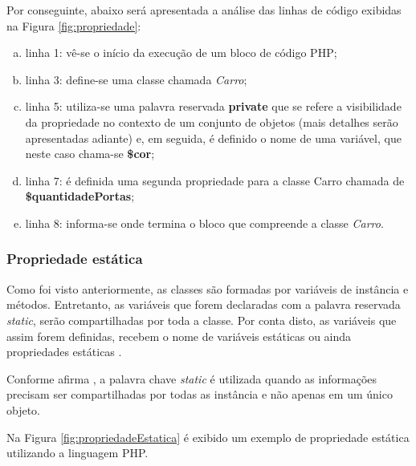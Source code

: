 \FloatBarrier 	%

Por conseguinte, abaixo será apresentada a análise das linhas de código
exibidas na Figura \ref{fig:propriedade}:

\begin{enumerate}[a)]
    \item linha 1: vê-se o início da execução de um bloco de código PHP;
    \item linha 3: define-se uma classe chamada \textit{Carro};
    \item linha 5: utiliza-se uma palavra reservada \textbf{private} que se
    refere a visibilidade da propriedade no contexto de um conjunto de objetos 
    (mais detalhes serão apresentadas adiante) e, em seguida, é definido o nome
    de uma variável, que neste caso chama-se \textbf{\$cor};
    \item linha 7: é definida uma segunda propriedade para a classe
    Carro chamada de \textbf{\$quantidadePortas};
    \item linha 8: informa-se onde termina o bloco que compreende a
    classe \textit{Carro}.
\end{enumerate}

\subsubsection{Propriedade estática}

Como foi visto anteriormente, as classes são formadas por variáveis de instância
e métodos. Entretanto, as variáveis que forem declaradas com a palavra reservada
\textit{static}, serão compartilhadas por toda a classe. Por conta disto, as
variáveis que assim forem definidas, recebem o nome de variáveis estáticas ou ainda
propriedades estáticas \cite{learningJava}.

Conforme afirma , a palavra chave \textit{static}
é utilizada quando as informações precisam ser compartilhadas por todas
as instância e não apenas em um único objeto.

Na Figura \ref{fig:propriedadeEstatica} é exibido um exemplo de propriedade 
estática utilizando a linguagem \acs{PHP}.

